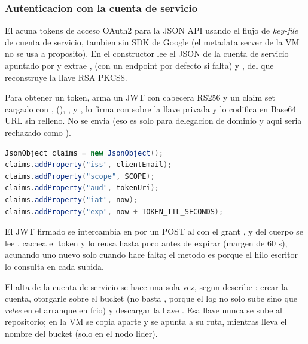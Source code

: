 \subsubsection{Autenticacion con la cuenta de servicio}

El  acuna tokens de acceso OAuth2 para la JSON API
usando el flujo de \emph{key-file} de cuenta de servicio, tambien sin SDK de
Google (el metadata server de la VM no se usa a proposito). En el constructor lee
el JSON de la cuenta de servicio apuntado por  y extrae
,  (con un endpoint por defecto si falta)
y , del que reconstruye la llave RSA PKCS8.

Para obtener un token,  arma un JWT con cabecera RS256 y
un claim set cargado con , 
(), ,  y , lo
firma con  sobre la llave privada y lo codifica en Base64
URL sin relleno. No se envia  (eso es solo para delegacion de
dominio y aqui seria rechazado como ).

\begin{lstlisting}[language=Java,caption={Claims del JWT que GcsAuth autofirma (RS256)}]
JsonObject claims = new JsonObject();
claims.addProperty("iss", clientEmail);
claims.addProperty("scope", SCOPE);
claims.addProperty("aud", tokenUri);
claims.addProperty("iat", now);
claims.addProperty("exp", now + TOKEN_TTL_SECONDS);
\end{lstlisting}

El JWT firmado se intercambia en  por un POST
 al  con el grant
, y del cuerpo se lee
.  cachea el token y lo reusa hasta
poco antes de expirar (margen  de 60 s), acunando
uno nuevo solo cuando hace falta; el metodo es  porque el
hilo escritor lo consulta en cada subida.

El alta de la cuenta de servicio se hace una sola vez, segun describe
: crear la cuenta, otorgarle 
sobre el bucket (no basta , porque el log no solo sube sino
que \emph{relee} en el arranque en frio) y descargar la llave
. Esa llave nunca se sube al repositorio; en la VM se
copia aparte y se apunta  a su ruta, mientras
 lleva el nombre del bucket (solo en el nodo lider).


